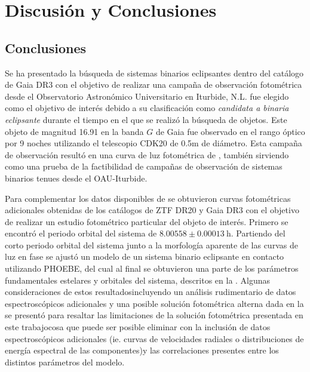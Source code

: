 \part{Discusión y Conclusiones}



\chapter{Conclusiones}

Se ha presentado la búsqueda de sistemas binarios eclipsantes dentro del
catálogo de Gaia DR3 con el objetivo de realizar una campaña de observación
fotométrica desde el Observatorio Astronómico Universitario en Iturbide, N.L.
\atoObjId fue elegido como el objetivo de interés debido a su clasificación como
\textit{candidata a binaria eclipsante} durante el tiempo en el que se realizó
la búsqueda de objetos. Este objeto de magnitud 16.91 en la banda $G$ de Gaia
fue observado en el rango óptico por 9 noches utilizando el telescopio CDK20 de
0.5m de diámetro. Esta campaña de observación resultó en una curva de luz
fotométrica de \atoObjIdNoSpace, también sirviendo como una prueba de la
factibilidad de campañas de observación de sistemas binarios tenues desde el
OAU-Iturbide.

Para complementar los datos disponibles de \atoObjId se obtuvieron curvas
fotométricas adicionales obtenidas de los catálogos de ZTF DR20 y Gaia DR3 con
el objetivo de realizar un estudio fotométrico particular del objeto de interés.
Primero se encontró el periodo orbital del sistema de $8.00558 \pm 0.00013 \
\mathrm{h}$. Partiendo del corto periodo orbital del sistema junto a la
morfología aparente de las curvas de luz en fase se ajustó un modelo de un
sistema binario eclipsante en contacto utilizando PHOEBE, del cual al final se
obtuvieron una parte de los parámetros fundamentales estelares y orbitales del
sistema, descritos en la
. Algunas
consideraciones de estos resultados\textemdash incluyendo un análisis
rudimentario de datos espectroscópicos adicionales y una posible solución
fotométrica alterna dada en la
\textemdash
se presentó para resaltar las limitaciones de la solución fotométrica presentada
en este trabajo\textemdash cosa que puede ser posible eliminar con la inclusión
de datos espectroscópicos adicionales (ie. curvas de velocidades radiales o
distribuciones de energía espectral de las componentes)\textemdash y las
correlaciones presentes entre los distintos parámetros del modelo.